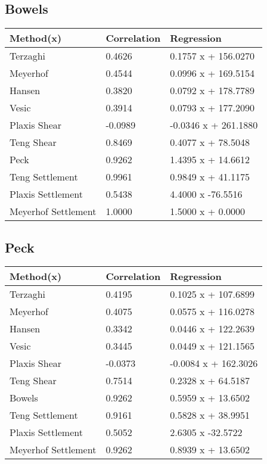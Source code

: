 \subsection{Bowels}
\begin{tabularx}{\textwidth}{ | p{} | X | X | }
\hline
\textbf{Method(x)} & \textbf{Correlation} & \textbf{Regression} \\
\hline
 Terzaghi & 0.4626 & 0.1757 x + 156.0270\\
 Meyerhof & 0.4544 & 0.0996 x + 169.5154\\
 Hansen & 0.3820 & 0.0792 x + 178.7789\\
 Vesic & 0.3914 & 0.0793 x + 177.2090\\
 Plaxis Shear & -0.0989 & -0.0346 x + 261.1880\\
 Teng Shear & 0.8469 & 0.4077 x + 78.5048\\
 Peck & 0.9262 & 1.4395 x + 14.6612\\
 Teng Settlement & 0.9961 & 0.9849 x + 41.1175\\
 Plaxis Settlement & 0.5438 & 4.4000 x  -76.5516\\
 Meyerhof Settlement & 1.0000 & 1.5000 x + 0.0000\\
\hline
\end{tabularx}
\subsection{Peck}
\begin{tabularx}{\textwidth}{ | p{} | X | X | }
\hline
\textbf{Method(x)} & \textbf{Correlation} & \textbf{Regression} \\
\hline
 Terzaghi & 0.4195 & 0.1025 x + 107.6899\\
 Meyerhof & 0.4075 & 0.0575 x + 116.0278\\
 Hansen & 0.3342 & 0.0446 x + 122.2639\\
 Vesic & 0.3445 & 0.0449 x + 121.1565\\
 Plaxis Shear & -0.0373 & -0.0084 x + 162.3026\\
 Teng Shear & 0.7514 & 0.2328 x + 64.5187\\
 Bowels & 0.9262 & 0.5959 x + 13.6502\\
 Teng Settlement & 0.9161 & 0.5828 x + 38.9951\\
 Plaxis Settlement & 0.5052 & 2.6305 x  -32.5722\\
 Meyerhof Settlement & 0.9262 & 0.8939 x + 13.6502\\
\hline
\end{tabularx}
